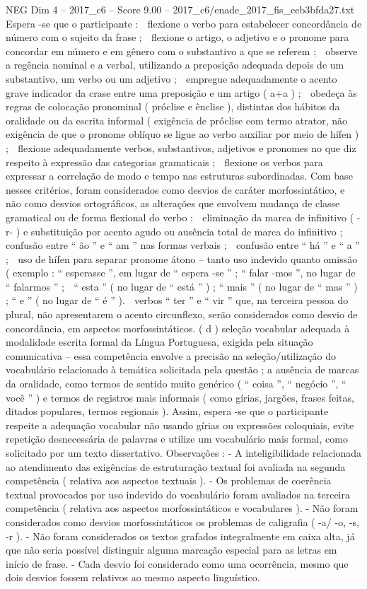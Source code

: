 \begin{textsample}{NEG Dim 4 – 2017\_c6 – Score 9.00 – 2017\_c6/enade\_2017\_fis\_eeb3bfda27.txt}
Espera -se que o participante :  flexione o verbo para estabelecer concordância de número com o sujeito da frase ;  flexione o artigo, o adjetivo e o pronome para concordar em número e em gênero com o substantivo a que se referem ;  observe a regência nominal e a verbal, utilizando a preposição adequada depois de um substantivo, um verbo ou um adjetivo ;  empregue adequadamente o acento grave indicador da crase entre uma preposição e um artigo ( a+a ) ;  obedeça às regras de colocação pronominal ( próclise e ênclise ), distintas dos hábitos da oralidade ou da escrita informal ( exigência de próclise com termo atrator, não exigência de que o pronome oblíquo se ligue ao verbo auxiliar por meio de hífen ) ;  flexione adequadamente verbos, substantivos, adjetivos e pronomes no que diz respeito à expressão das categorias gramaticais ;  flexione os verbos para expressar a correlação de modo e tempo nas estruturas subordinadas.
Com base nesses critérios, foram considerados como desvios de caráter morfossintático, e não como desvios ortográficos, as alterações que envolvem mudança de classe gramatical ou de forma flexional do verbo :  eliminação da marca de infinitivo ( -r- ) e substituição por acento agudo ou ausência total de marca do infinitivo ;  confusão entre “ ão ” e “ am ” nas formas verbais ;  confusão entre “ há ” e “ a ” ;  uso de hífen para separar pronome átono – tanto uso indevido quanto omissão ( exemplo : “ esperasse ”, em lugar de “ espera -se ” ; “ falar -mos ”, no lugar de “ falarmos ” ;  “ esta ” ( no lugar de “ está ” ) ; “ mais ” ( no lugar de “ mas ” ) ; “ e ” ( no lugar de “ é ” ).  verbos “ ter ” e “ vir ” que, na terceira pessoa do plural, não apresentarem o acento circunflexo, serão considerados como desvio de concordância, em aspectos morfossintáticos. ( d ) seleção vocabular adequada à modalidade escrita formal da Língua Portuguesa, exigida pela situação comunicativa – essa competência envolve a precisão na seleção/utilização do vocabulário relacionado à temática solicitada pela questão ; a ausência de marcas da oralidade, como termos de sentido muito genérico ( “ coisa ”, “ negócio ”, “ você ” ) e termos de registros mais informais ( como gírias, jargões, frases feitas, ditados populares, termos regionais ).
Assim, espera -se que o participante respeite a adequação vocabular não usando gírias ou expressões coloquiais, evite repetição desnecessária de palavras e utilize um vocabulário mais formal, como solicitado por um texto dissertativo.
Observações : - A inteligibilidade relacionada ao atendimento das exigências de estruturação textual foi avaliada na segunda competência ( relativa aos aspectos textuais ). - Os problemas de coerência textual provocados por uso indevido do vocabulário foram avaliados na terceira competência ( relativa aos aspectos morfossintáticos e vocabulares ). - Não foram considerados como desvios morfossintáticos os problemas de caligrafia ( -a/ -o, -s, -r ). - Não foram considerados os textos grafados integralmente em caixa alta, já que não seria possível distinguir alguma marcação especial para as letras em início de frase. - Cada desvio foi considerado como uma ocorrência, mesmo que dois desvios fossem relativos ao mesmo aspecto linguístico.

\end{textsample}
